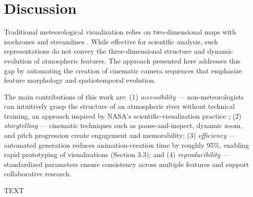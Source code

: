 \documentclass[journal abbreviation, manuscript]{copernicus}
\begin{document}
\section{Discussion}

Traditional meteorological visualization relies on two-dimensional maps with isochrones and streamlines \citep{newell1992, ralph2018}. While effective for scientific analysis, such representations do not convey the three-dimensional structure and dynamic evolution of atmospheric features. The approach presented here addresses this gap by automating the creation of cinematic camera sequences that emphasize feature morphology and spatiotemporal evolution.

The main contributions of this work are: (1) \textit{accessibility} --- non-meteorologists can intuitively grasp the structure of an atmospheric river without technical training, an approach inspired by NASA's scientific-visualization practice \citep{nasa-climate}; (2) \textit{storytelling} --- cinematic techniques such as pause-and-inspect, dynamic zoom, and pitch progression create engagement and memorability; (3) \textit{efficiency} --- automated generation reduces animation-creation time by roughly 95\%, enabling rapid prototyping of visualizations (Section 3.3); and (4) \textit{reproducibility} --- standardized parameters ensure consistency across multiple features and support collaborative research.


\conclusions  %
TEXT












\appendix
\section{}    %
\end{document}
